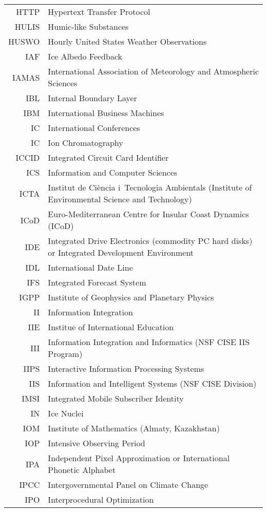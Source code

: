 \documentclass[12pt,twoside]{article}
\begin{document}
\begin{longtable}[>{\bfseries}l]{>{\ttfamily}r l}
HTTP & Hypertext Transfer Protocol \\
HULIS & Humic-like Substances \\
HUSWO & Hourly United States Weather Observations \\
IAF & Ice Albedo Feedback \\
IAMAS & International Association of Meteorology and Atmospheric Sciences \\
IBL & Internal Boundary Layer \\
IBM & International Business Machines \\
IC & International Conferences \\
IC & Ion Chromatography \\
ICCID & Integrated Circuit Card Identifier \\
ICS & Information and Computer Sciences \\
ICTA & Institut de Ci\`{e}ncia i~Tecnologia Ambientals (Institute of Environmental Science and Technology) \\
ICoD & Euro-Mediterranean Centre for Insular Coast Dynamics (ICoD) \\
IDE & Integrated Drive Electronics (commodity PC hard disks) or Integrated Development Environment \\
IDL & International Date Line \\
IFS & Integrated Forecast System \\
IGPP & Institute of Geophysics and Planetary Physics \\
II & Information Integration \\
IIE & Institue of International Education \\
III & Information Integration and Informatics (NSF CISE IIS Program) \\
IIPS & Interactive Information Processing Systems \\
IIS & Information and Intelligent Systems (NSF CISE Division) \\
IMSI & Integrated Mobile Subscriber Identity \\
IN & Ice Nuclei \\
IOM & Institute of Mathematics (Almaty, Kazakhstan) \\
IOP & Intensive Observing Period \\
IPA & Independent Pixel Approximation or International Phonetic Alphabet \\
IPCC & Intergovernmental Panel on Climate Change \\
IPO & Interprocedural Optimization \\

\end{longtable}
\end{document}

